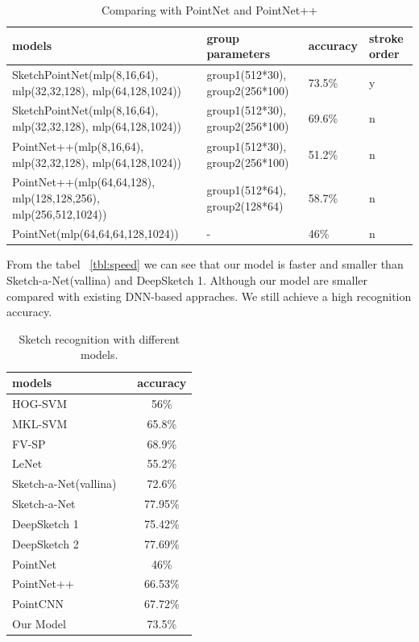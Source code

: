\begin{table}
\centering
\begin{tabular}{llll}
    \hline
     models&group parameters& accuracy& stroke order\\
    \hline
     SketchPointNet(mlp(8,16,64), mlp(32,32,128), mlp(64,128,1024))&group1(512*30), group2(256*100)& 73.5\% & y\\
    \hline
     SketchPointNet(mlp(8,16,64), mlp(32,32,128), mlp(64,128,1024))&group1(512*30), group2(256*100)& 69.6\% & n\\
    \hline
     PointNet++(mlp(8,16,64), mlp(32,32,128), mlp(64,128,1024))&group1(512*30), group2(256*100)& 51.2\% &n\\
    \hline
     PointNet++(mlp(64,64,128), mlp(128,128,256), mlp(256,512,1024))&group1(512*64), group2(128*64)& 58.7\% &n\\
    \hline
     PointNet(mlp(64,64,64,128,1024))&-& 46\% &n\\
    \hline
\end{tabular}
\caption{Comparing with PointNet and PointNet++}
\label{tbl:pointnet_cp}
\end{table}

From the tabel ~\ref{tbl:speed} we can see that our model is faster and smaller than Sketch-a-Net(vallina) and DeepSketch 1. Although our model are smaller compared with existing DNN-based appraches. We still achieve a high recognition accuracy.

\begin{table}[htbp]
\centering
\begin{tabular}{lc}
    \hline
     models &accuracy\\
    \hline
     HOG-SVM ~\cite{Eitz2012HowDH}& 56\% \\
     MKL-SVM ~\cite{LiHSG15} & 65.8\% \\
     FV-SP ~\cite{Schneider2014SketchCA} & 68.9\% \\
     LeNet ~\cite{LeCun1998GradientbasedLA}& 55.2\% \\
     Sketch-a-Net(vallina) ~\cite{Yu2015SketchaNetTB}& 72.6\% \\
     Sketch-a-Net ~\cite{Yu2015SketchaNetTB}& 77.95\% \\
     DeepSketch 1 ~\cite{Seddati2015DeepSketchDC}& 75.42\% \\
     DeepSketch 2 ~\cite{Dupont2016DeepSketch2D}& 77.69\% \\
     PointNet ~\cite{qi2017pointnet}& 46\% \\
     PointNet++ ~\cite{qi2017pointnetplusplus}& 66.53\% \\
     PointCNN ~\cite{1801.07791}& 67.72\% \\
     Our Model& 73.5\% \\
    \hline
\end{tabular}
\caption{Sketch recognition with different models.}
\label{tbl:acc}
\end{table}

